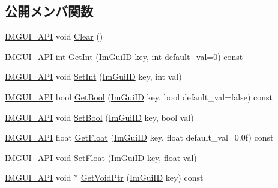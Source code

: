 \subsection*{公開メンバ関数}
\begin{DoxyCompactItemize}
\item 
\mbox{\hyperlink{imgui_8h_a43829975e84e45d1149597467a14bbf5}{I\+M\+G\+U\+I\+\_\+\+A\+PI}} void \mbox{\hyperlink{struct_im_gui_storage_a72ceecfbca3d08df8c2a232b77890c20}{Clear}} ()
\item 
\mbox{\hyperlink{imgui_8h_a43829975e84e45d1149597467a14bbf5}{I\+M\+G\+U\+I\+\_\+\+A\+PI}} int \mbox{\hyperlink{struct_im_gui_storage_ac86b64f5c69a15de6c6c326963eca64a}{Get\+Int}} (\mbox{\hyperlink{imgui_8h_a1785c9b6f4e16406764a85f32582236f}{Im\+Gui\+ID}} key, int default\+\_\+val=0) const
\item 
\mbox{\hyperlink{imgui_8h_a43829975e84e45d1149597467a14bbf5}{I\+M\+G\+U\+I\+\_\+\+A\+PI}} void \mbox{\hyperlink{struct_im_gui_storage_af83975ca841a9bd0e06a6ea0a41bf159}{Set\+Int}} (\mbox{\hyperlink{imgui_8h_a1785c9b6f4e16406764a85f32582236f}{Im\+Gui\+ID}} key, int val)
\item 
\mbox{\hyperlink{imgui_8h_a43829975e84e45d1149597467a14bbf5}{I\+M\+G\+U\+I\+\_\+\+A\+PI}} bool \mbox{\hyperlink{struct_im_gui_storage_a22d34ae6278f86468a3e7df8fbd1b632}{Get\+Bool}} (\mbox{\hyperlink{imgui_8h_a1785c9b6f4e16406764a85f32582236f}{Im\+Gui\+ID}} key, bool default\+\_\+val=false) const
\item 
\mbox{\hyperlink{imgui_8h_a43829975e84e45d1149597467a14bbf5}{I\+M\+G\+U\+I\+\_\+\+A\+PI}} void \mbox{\hyperlink{struct_im_gui_storage_ac5beee31a59b3f5294b41992717be7bf}{Set\+Bool}} (\mbox{\hyperlink{imgui_8h_a1785c9b6f4e16406764a85f32582236f}{Im\+Gui\+ID}} key, bool val)
\item 
\mbox{\hyperlink{imgui_8h_a43829975e84e45d1149597467a14bbf5}{I\+M\+G\+U\+I\+\_\+\+A\+PI}} float \mbox{\hyperlink{struct_im_gui_storage_a0f51ef327f7e548d003b0e006967c1eb}{Get\+Float}} (\mbox{\hyperlink{imgui_8h_a1785c9b6f4e16406764a85f32582236f}{Im\+Gui\+ID}} key, float default\+\_\+val=0.\+0f) const
\item 
\mbox{\hyperlink{imgui_8h_a43829975e84e45d1149597467a14bbf5}{I\+M\+G\+U\+I\+\_\+\+A\+PI}} void \mbox{\hyperlink{struct_im_gui_storage_ab531d90a0e5a1a2453e351c499149756}{Set\+Float}} (\mbox{\hyperlink{imgui_8h_a1785c9b6f4e16406764a85f32582236f}{Im\+Gui\+ID}} key, float val)
\item 
\mbox{\hyperlink{imgui_8h_a43829975e84e45d1149597467a14bbf5}{I\+M\+G\+U\+I\+\_\+\+A\+PI}} void $\ast$ \mbox{\hyperlink{struct_im_gui_storage_aaf87a98ede89da09113b0189f6d878ca}{Get\+Void\+Ptr}} (\mbox{\hyperlink{imgui_8h_a1785c9b6f4e16406764a85f32582236f}{Im\+Gui\+ID}} key) const

\end{DoxyCompactItemize}
